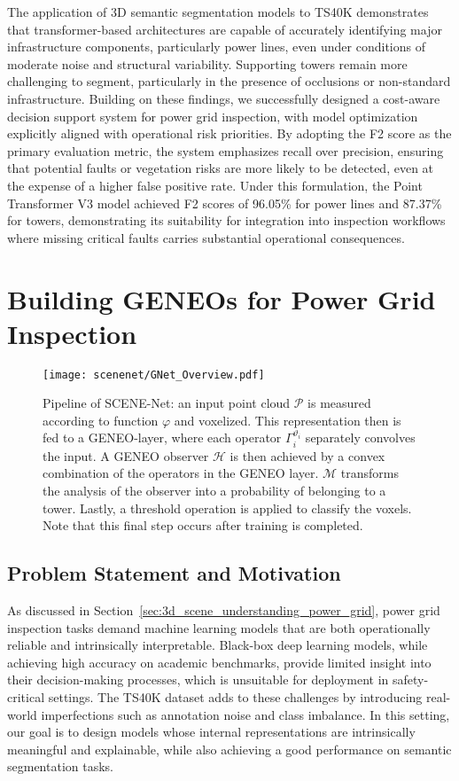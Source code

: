 The application of 3D semantic segmentation models to TS40K demonstrates that
transformer-based architectures are capable of accurately identifying major
infrastructure components, particularly power lines, even under conditions of
moderate noise and structural variability.
%
Supporting towers remain more challenging to segment, particularly in the
presence of occlusions or non-standard infrastructure.
%
Building on these findings, we successfully designed a cost-aware decision
support system for power grid inspection, with model optimization explicitly
aligned with operational risk priorities. By adopting the F2 score as the
primary evaluation metric, the system emphasizes recall over precision,
ensuring that potential faults or vegetation risks are more likely to be
detected, even at the expense of a higher false positive rate. Under this
formulation, the Point Transformer V3 model achieved F2 scores of 96.05\% for
power lines and 87.37\% for towers, demonstrating its suitability for
integration into inspection workflows where missing critical faults carries
substantial operational consequences.

\section{Building GENEOs for Power Grid Inspection}\label{sec:scenenetv1}

\begin{figure}[ht]\label{fig:gnet_overview}
      \centering
      \texttt{[image: scenenet/GNet\_Overview.pdf]}
      \caption[SCENE-Net Architecture]{Pipeline of SCENE-Net: an input point cloud  $\mathcal{P}$ is measured according to function $\varphi$ and voxelized. This representation then is fed to a GENEO-layer, where each operator $\Gamma_i^{\vartheta_i}$ separately convolves the input.
            A GENEO observer $\mathcal{H}$ is then achieved by a convex combination of the operators in the GENEO layer.
            $\mathcal{M}$ transforms the analysis of the observer into a probability of belonging to a tower. %
            Lastly, a threshold operation is applied to classify the voxels. Note that this final step occurs after training is completed.
      }
\end{figure}
\subsection{Problem Statement and Motivation}
As discussed in Section~\ref{sec:3d_scene_understanding_power_grid}, power grid
inspection tasks demand machine learning models that are both operationally
reliable and intrinsically interpretable. Black-box deep learning models, while
achieving high accuracy on academic benchmarks, provide limited insight into
their decision-making processes, which is unsuitable for deployment in
safety-critical settings.
%
The TS40K dataset adds to these challenges by introducing real-world
imperfections such as annotation noise and class imbalance. In this setting,
our goal is to design models whose internal representations are intrinsically
meaningful and explainable, while also achieving a good performance on semantic
segmentation tasks.

